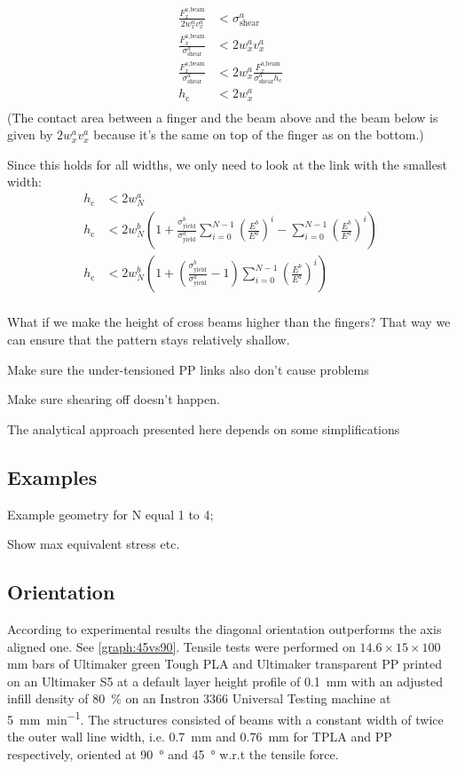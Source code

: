 \begin{align*}
	\frac{F^{a \text{,beam}}_x }{2w^a_x v^a_x} &< \sigma^a_\text{shear} \\
	\frac{F^{a \text{,beam}}_x }{ \sigma^a_\text{shear}} &< 2 w^a_x v^a_x \\
	\frac{F^{a \text{,beam}}_x }{ \sigma^a_\text{shear}} &< 2 w^a_x \frac{ F^{a \text{,beam}}_x }{\sigma^a_\text{shear} h_\text{c}} \\
	h_\text{c} &< 2 w^a_x  \\
\end{align*}
(The contact area between a finger and the beam above and the beam below is given by $2 w^a_x v^a_x$ because it's the same on top of the finger as on the bottom.)

Since this holds for all widths, we only need to look at the link with the smallest width:
\begin{align*}
	h_\text{c} &< 2 w^a_N \\
	h_\text{c} &< 2 w^b_N \left( 1 + \frac{\sigma^b_\text{yield}}{\sigma^a_\text{yield}} \sum\limits_{i=0}^{N-1} \left(\frac{E^b}{E^a}\right)^i  - \sum\limits_{i=0}^{N-1} \left(\frac{E^b}{E^a}\right)^i  \right) \\
	h_\text{c} &< 2 w^b_N \left( 1 + \left( \frac{\sigma^b_\text{yield}}{\sigma^a_\text{yield}} - 1 \right)     \sum\limits_{i=0}^{N-1} \left(\frac{E^b}{E^a}\right)^i   \right) \\
\end{align*}



What if we make the height of cross beams higher than the fingers?
That way we can ensure that the pattern stays relatively shallow.

Make sure the under-tensioned PP links also don't cause problems

Make sure shearing off doesn't happen.


The analytical approach presented here depends on some simplifications


\subsection{Examples}
Example geometry for N equal 1 to 4;

Show max equivalent stress etc.


\subsection{Orientation}
According to experimental results the diagonal orientation outperforms the axis aligned one.
See \cref{graph:45vs90}.
Tensile tests were performed on $14.6\times15\times100$\si{\milli\meter} bars of Ultimaker green Tough PLA and Ultimaker transparent PP
printed on an Ultimaker S5 at a default layer height profile of \SI{0.1}{\milli\meter} with an adjusted infill density of \SI{80}{\percent}
on an Instron 3366 Universal Testing machine at \SI{5}{\milli\meter\per\minute}.
The structures consisted of beams with a constant width of twice the outer wall line width, i.e. \SI{0.7}{\milli\meter} and \SI{0.76}{\milli\meter} for TPLA and PP respectively,
oriented at \SI{90}{\degree} and \SI{45}{\degree} w.r.t the tensile force.

